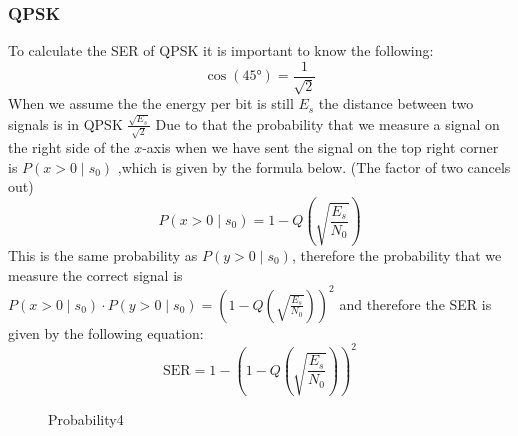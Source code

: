 \subsubsection{QPSK}
To calculate the SER of QPSK it is important to know the following:
$$\cos(\ang{45})=\frac{1}{\sqrt{2}}$$
When we assume the the energy per bit is still $E_s$ the distance between two signals is in QPSK $\frac{\sqrt{E_s}}{\sqrt{2}}$ Due to that the probability that we measure a signal on the right side of the $x$-axis when we have sent the signal on the top right corner is $P\left(x>0 \mid s_0\right)$ ,which is given by the formula below. (The factor of two cancels out)
$$
P\left(x>0 \mid s_0\right)=1-Q\left(\sqrt{\frac{E_s}{N_0}}\right)
$$
This is the same probability as $P\left(y>0 \mid s_0\right)$, therefore the probability that we measure the correct signal is $P\left(x>0 \mid s_0\right) \cdot P\left(y>0 \mid s_0\right)= \left(1-Q\left(\sqrt{\frac{E_s}{N_0}}\right)\right)^2$ and therefore the SER is given by the following equation:
\begin{equation}\label{eq:symbol_error_rate_qpsk}
\mathrm{SER}=1-\left(1-Q\left(\sqrt{\frac{E_s}{N_0}}\right)\right)^2
\end{equation}
\begin{figure}[ht]
  \centering
  \caption{Probability4}
  \label{fig:probability_4}
\end{figure}
